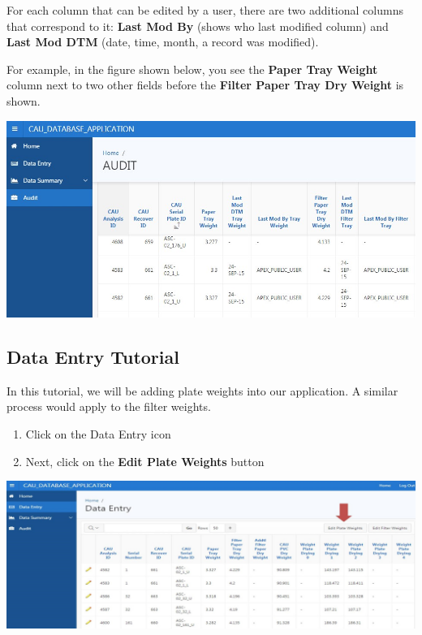 \documentclass[
]{book}
\begin{document}
For each column that can be edited by a user, there are two additional columns that correspond to it: \textbf{Last Mod By} (shows who last modified column) and \textbf{Last Mod DTM} (date, time, month, a record was modified).

For example, in the figure shown below, you see the \textbf{Paper Tray Weight} column next to two other fields before the \textbf{Filter Paper Tray Dry Weight} is shown.

\includegraphics{images/Data10.jpg}

\hypertarget{data-entry-tutorial}{%
\subsection{Data Entry Tutorial}\label{data-entry-tutorial}}

In this tutorial, we will be adding plate weights into our application. A similar process would apply to the filter weights.

\begin{enumerate}
\def\labelenumi{\arabic{enumi}.}
\item
  Click on the Data Entry icon
\item
  Next, click on the \textbf{Edit Plate Weights} button
\end{enumerate}

\includegraphics{images/Data11.jpg}
\end{document}
